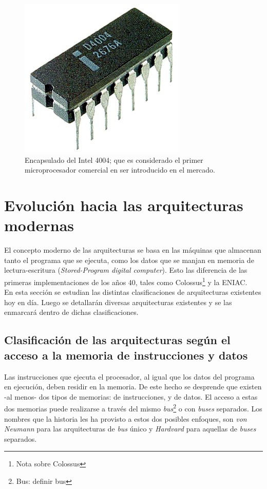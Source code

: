 \begin{figure}
  \centering
  \includegraphics[scale=0.5]{./figures/C02-intel_4004}
  \captionsetup{justification=centering}
  \caption{Encapsulado del Intel 4004; que es considerado el primer microprocesador comercial en ser introducido en el mercado.}
  \label{fig:C02-intel_4004}
\end{figure}

\section{Evolución hacia las arquitecturas modernas}

El concepto moderno de las arquitecturas se basa en las máquinas que almacenan tanto el programa que se ejecuta, como los datos que se manjan en memoria de lectura-escritura (\emph{Stored-Program digital computer}). Esto las diferencia de las primeras implementaciones de los años 40, tales como Colossus\footnote{Nota sobre Colossus} y la ENIAC.\\
En esta sección se estudian las distintas clasificaciones de arquitecturas existentes hoy en día. Luego se detallarán diversas arquitecturas existentes y se las enmarcará dentro de dichas clasificaciones.

\subsection{Clasificación de las arquitecturas según el acceso a la memoria de instrucciones y datos}

Las instrucciones que ejecuta el procesador, al igual que los datos del programa en ejecución, deben residir en la memoria. De este hecho se desprende que existen -al menos- dos tipos de memorias: de instrucciones, y de datos. El acceso a estas dos memorias puede realizarse a través del mismo \emph{bus}\footnote{Bus: definir bus} o con \emph{buses} separados. Los nombres que la historia les ha provisto a estos dos posibles enfoques, son \emph{von Neumann} para las arquitecturas de \emph{bus} único y \emph{Hardvard} para aquellas de \emph{buses} separados.

